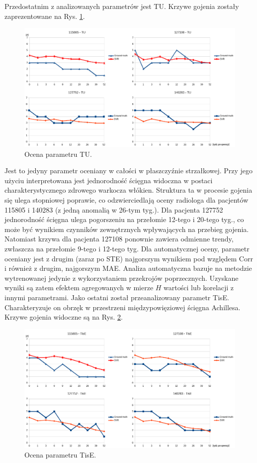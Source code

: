 Przedostatnim z analizowanych parametrów jest TU. Krzywe gojenia zostały zaprezentowane na Rys. \ref{fig:TU}.  
\begin{figure}[h!]
	\centering
	\includegraphics[width=1\textwidth]{figures/TU.png}
	\caption{Ocena parametru TU.}\label{fig:TU}
\end{figure}
Jest to jedyny parametr oceniany w całości w płaszczyźnie strzałkowej. Przy jego użyciu interpretowana jest jednorodność ścięgna widoczna w postaci charakterystycznego zdrowego warkocza włókien. Struktura \linebreak ta w procesie gojenia się ulega stopniowej poprawie, co odzwierciedlają oceny radiologa dla pacjentów 115805 i 140283 (z jedną anomalią w 26-tym tyg.). Dla pacjenta 127752 jednorodność ścięgna ulega pogorszeniu na przełomie 12-tego i 20-tego tyg., co może być wynikiem czynników zewnętrznych wpływających na przebieg gojenia. Natomiast krzywa dla pacjenta 127108 ponownie zawiera odmienne trendy, zwłaszcza na przełomie 9-tego i 12-tego tyg. Dla automatycznej oceny, parametr oceniany jest z drugim (zaraz po STE) najgorszym wynikiem pod względem Corr i również \linebreak z drugim, najgorszym MAE. Analiza automatyczna bazuje na metodzie wytrenowanej jedynie z wykorzystaniem przekrojów poprzecznych. Uzyskane wyniki są zatem efektem agregowanych w mierze $H$ wartości lub korelacji z innymi parametrami. 
\newpage
Jako ostatni został przeanalizowany parametr TisE. Charakteryzuje on obrzęk \linebreak w przestrzeni międzypowięziowej ścięgna Achillesa. Krzywe gojenia widoczne \linebreak są na Rys. \ref{fig:TisE}.
\begin{figure}[h!]
	\centering
	\includegraphics[width=1\textwidth]{figures/TisE.png}
	\caption{Ocena parametru TisE.}\label{fig:TisE}
\end{figure}
